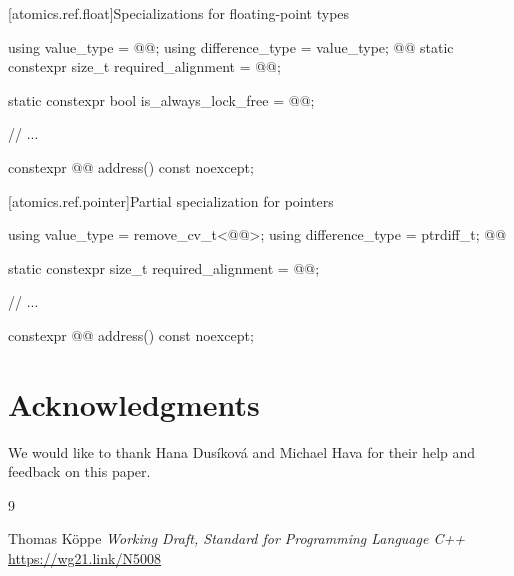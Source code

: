 \documentclass{wg21}
\begin{document}
[atomics.ref.float]{Specializations for floating-point types}

\begin{codeblock}
using value_type = @@;
using difference_type = value_type;
@@
static constexpr size_t required_alignment = @@;


static constexpr bool is_always_lock_free = @@;

// ...

constexpr @@ address() const noexcept;
\end{codeblock}

[atomics.ref.pointer]{Partial specialization for pointers}

\begin{codeblock}
using value_type = remove_cv_t<@@>;
using difference_type = ptrdiff_t;
@@

static constexpr size_t required_alignment = @@;

// ...

constexpr @@ address() const noexcept;
\end{codeblock}


\section{Acknowledgments}

We would like to thank Hana Dusíková and Michael Hava for their help and feedback on this paper.




\renewcommand{\section}[2]{}%

\begin{thebibliography}{9}

Thomas Köppe
\emph{Working Draft, Standard for Programming Language C++}\newline
\url{https://wg21.link/N5008}


\end{thebibliography}
\end{document}

